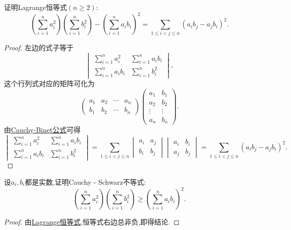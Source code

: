\documentclass[../../main.tex]{subfiles}%
\begin{document}
\begin{lemma}[Lagrange恒等式]\label{lemma:Lagrange恒等式}
证明Lagrange恒等式\((n\geqslant 2)\):
\[
\left(\sum_{i = 1}^{n}a_i^2\right)\left(\sum_{i = 1}^{n}b_i^2\right)-\left(\sum_{i = 1}^{n}a_ib_i\right)^2=\sum_{1\leqslant  i<j\leqslant  n}(a_ib_j - a_jb_i)^2.
\]
\end{lemma}
\begin{proof}

左边的式子等于
\[
\begin{vmatrix}
\sum_{i = 1}^{n}a_i^2 & \sum_{i = 1}^{n}a_ib_i\\
\sum_{i = 1}^{n}a_ib_i & \sum_{i = 1}^{n}b_i^2
\end{vmatrix},
\]
这个行列式对应的矩阵可化为
\[
\begin{pmatrix}
a_1 & a_2 & \cdots & a_n\\
b_1 & b_2 & \cdots & b_n
\end{pmatrix}
\begin{pmatrix}
a_1 & b_1\\
a_2 & b_2\\
\vdots & \vdots\\
a_n & b_n
\end{pmatrix}.
\]
由\hyperref[theorem:Cauchy-Binet公式]{Cauchy-Binet公式}可得
\[
\begin{vmatrix}
\sum\limits_{i = 1}^{n}a_i^2 & \sum\limits_{i = 1}^{n}a_ib_i\\
\sum\limits_{i = 1}^{n}a_ib_i & \sum\limits_{i = 1}^{n}b_i^2
\end{vmatrix}
=\sum_{1\leqslant  i<j\leqslant  n}
\begin{vmatrix}
a_i & a_j\\
b_i & b_j
\end{vmatrix}
\begin{vmatrix}
a_i & b_i\\
a_j & b_j
\end{vmatrix}
=\sum_{1\leqslant  i<j\leqslant  n}(a_ib_j - a_jb_i)^2.
\]  

\end{proof}

\begin{theorem}\label{theorem:Cauchy - Schwarz不等式}
设\(a_i,b_i\)都是实数,证明Cauchy - Schwarz不等式:
\[
\left(\sum_{i = 1}^{n}a_i^2\right)\left(\sum_{i = 1}^{n}b_i^2\right)\geqslant \left(\sum_{i = 1}^{n}a_ib_i\right)^2.
\]
\end{theorem}
\begin{proof}

由\hyperref[lemma:Lagrange恒等式]{Lagrange恒等式},恒等式右边总非负,即得结论.

\end{proof}
\end{document}
